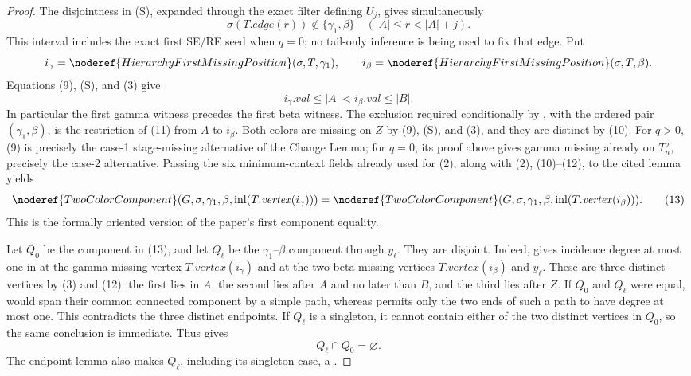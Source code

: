\begin{proof}
The disjointness in (S), expanded through the exact filter defining
$U_j$, gives simultaneously
\[
 \sigma(T.\mathit{edge}(r))\notin\{\gamma_1,\beta\}
       \quad(|A|\le r<|A|+j).                                 \tag{11}
\]
This interval includes the exact first SE/RE seed when $q=0$; no
tail-only inference is being used to fix that edge.  Put
\[
 i_\gamma=\noderef{HierarchyFirstMissingPosition}
     (\sigma,T,\gamma_1),\qquad
 i_\beta=\noderef{HierarchyFirstMissingPosition}(\sigma,T,\beta).
\]
Equations (9), (S), and (3) give
\[
 i_\gamma.\mathit{val}\le |A|<i_\beta.\mathit{val}\le |B|.  \tag{12}
\]
In particular the first gamma witness precedes the first beta witness.
The exclusion required conditionally by , with
the ordered pair $(\gamma_1,\beta)$, is the restriction of (11) from
$A$ to $i_\beta$.  Both colors are missing on $Z$ by (9), (S), and
(3), and they are distinct by (10).  For $q>0$, (9) is precisely the
case-1 stage-missing alternative of the Change Lemma; for $q=0$, its
proof above gives gamma missing already on $T_n^\sigma$, precisely the
case-2 alternative.  Passing the six minimum-context fields already
used for (2), along with (2), (10)--(12), to the cited lemma yields
\[
 \noderef{TwoColorComponent}(G,\sigma,\gamma_1,\beta,
       \operatorname{inl}(T.\mathit{vertex}(i_\gamma)))
 =
 \noderef{TwoColorComponent}(G,\sigma,\gamma_1,\beta,
       \operatorname{inl}(T.\mathit{vertex}(i_\beta))).       \tag{13}
\]
This is the formally oriented version of the paper's first component
equality.

Let $Q_0$ be the component in (13), and let $Q_\ell$ be the
$\gamma_1$--$\beta$ component through $y_\ell$.  They are disjoint.
Indeed,  gives incidence degree
at most one in  at the gamma-missing vertex
$T.\mathit{vertex}(i_\gamma)$ and at the two beta-missing vertices
$T.\mathit{vertex}(i_\beta)$ and $y_\ell$.  These are three distinct
vertices by (3) and (12): the first lies in $A$, the second lies after
$A$ and no later than $B$, and the third lies after $Z$.  If $Q_0$ and
$Q_\ell$ were equal,  would span
their common connected component by a simple path, whereas
 permits only the two ends of
such a path to have degree at most one.  This contradicts the three
distinct endpoints.  If $Q_\ell$ is a singleton, it cannot contain either
of the two distinct vertices in $Q_0$, so the same conclusion is
immediate.  Thus  gives
\[
                              Q_\ell\cap Q_0=\varnothing.      \tag{14}
\]
The endpoint lemma also makes $Q_\ell$, including its singleton case, a
.


\end{proof}
